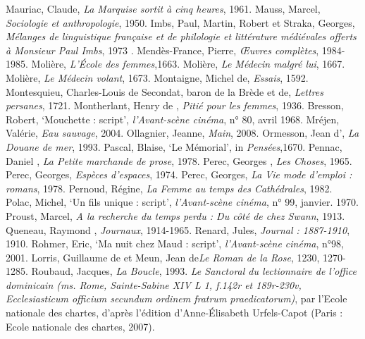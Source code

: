 \begin{bibitemlist}{1}
 Mauriac, Claude, \textit{La Marquise sortit à cinq heures}, 1961.
 Mauss, Marcel, \textit{Sociologie et anthropologie}, 1950.
 Imbs, Paul, Martin, Robert et Straka, Georges, \textit{Mélanges de linguistique française et de philologie et littérature médiévales offerts à Monsieur Paul Imbs}, 1973 .
 Mendès-France, Pierre, \textit{Œuvres complètes}, 1984-1985.
 Molière, \textit{L'École des femmes},1663.
 Molière, \textit{Le Médecin malgré lui}, 1667.
 Molière, \textit{Le Médecin volant}, 1673.
 Montaigne, Michel de, \textit{Essais}, 1592.
 Montesquieu, Charles-Louis de Secondat, baron de la Brède et de, \textit{Lettres persanes}, 1721.
 Montherlant, Henry de , \textit{Pitié pour les femmes}, 1936.
 Bresson, Robert, ‘Mouchette : script’, \textit{l'Avant-scène cinéma}, n° 80, avril 1968.
 Mréjen, Valérie, \textit{Eau sauvage}, 2004.
 Ollagnier, Jeanne, \textit{Main}, 2008.
 Ormesson, Jean d', \textit{La Douane de mer}, 1993.
 Pascal, Blaise, ‘Le Mémorial’, in \textit{Pensées},1670.
 Pennac, Daniel , \textit{La Petite marchande de prose}, 1978.
 Perec, Georges , \textit{Les Choses}, 1965.
 Perec, Georges, \textit{Espèces d'espaces}, 1974.
 Perec, Georges, \textit{La Vie mode d'emploi : romans}, 1978.
 Pernoud, Régine, \textit{La Femme au temps des Cathédrales}, 1982.
 Polac, Michel, ‘Un fils unique : script’, \textit{l'Avant-scène cinéma}, n° 99, janvier. 1970.
 Proust, Marcel, \textit{A la recherche du temps perdu : Du côté de chez Swann}, 1913.
 Queneau, Raymond , \textit{Journaux}, 1914-1965.
 Renard, Jules, \textit{Journal : 1887-1910}, 1910.
 Rohmer, Eric, ‘Ma nuit chez Maud : script’, \textit{l'Avant-scène cinéma}, n°98, 2001.
 Lorris, Guillaume de et Meun, Jean de\textit{Le Roman de la Rose}, 1230, 1270-1285.
 Roubaud, Jacques, \textit{La Boucle}, 1993.
 \textit{Le Sanctoral du lectionnaire de l'office dominicain (ms. Rome, Sainte-Sabine XIV L 1, f.142r et 189r-230v, Ecclesiasticum officium secundum ordinem fratrum praedicatorum)},  par l'Ecole nationale des chartes, d'après l'édition d'Anne-Élisabeth Urfels-Capot (Paris : Ecole nationale des chartes, 2007).

\end{bibitemlist}
